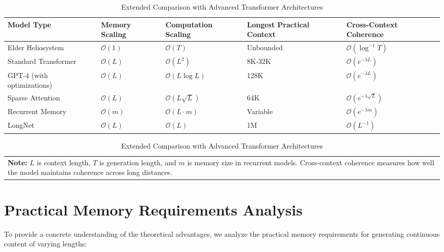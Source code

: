 \begin{table}[ht]
\centering
\caption{Extended Comparison with Advanced Transformer Architectures}
\begin{tabular}{|p{3cm}|p{2.2cm}|p{2.2cm}|p{2.2cm}|p{2.2cm}|}
\hline
\textbf{Model Type} & \textbf{Memory Scaling} & \textbf{Computation Scaling} & \textbf{Longest Practical Context} & \textbf{Cross-Context Coherence} \\
\hline
Elder Heliosystem & $\mathcal{O}(1)$ & $\mathcal{O}(T)$ & Unbounded & $\mathcal{O}(\log^{-1} T)$ \\
\hline
Standard Transformer & $\mathcal{O}(L)$ & $\mathcal{O}(L^2)$ & 8K-32K & $\mathcal{O}(e^{-\lambda L})$ \\
\hline
GPT-4 (with optimizations) & $\mathcal{O}(L)$ & $\mathcal{O}(L \log L)$ & 128K & $\mathcal{O}(e^{-\lambda L})$ \\
\hline
Sparse Attention & $\mathcal{O}(L)$ & $\mathcal{O}(L \sqrt{L})$ & 64K & $\mathcal{O}(e^{-\lambda \sqrt{L}})$ \\
\hline
Recurrent Memory & $\mathcal{O}(m)$ & $\mathcal{O}(L \cdot m)$ & Variable & $\mathcal{O}(e^{-\lambda m})$ \\
\hline
LongNet & $\mathcal{O}(L)$ & $\mathcal{O}(L)$ & 1M & $\mathcal{O}(L^{-1})$ \\
\hline
\end{tabular}

\begin{tabular}{p{15cm}}
\textbf{Note:} $L$ is context length, $T$ is generation length, and $m$ is memory size in recurrent models. Cross-context coherence measures how well the model maintains coherence across long distances.
\end{tabular}
\end{table}

\section{Practical Memory Requirements Analysis}

To provide a concrete understanding of the theoretical advantages, we analyze the practical memory requirements for generating continuous content of varying lengths:

